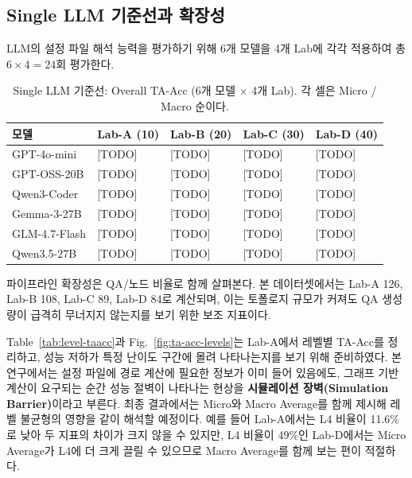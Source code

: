 \documentclass[journal]{IEEEtran}
\begin{document}
\subsection{Single LLM 기준선과 확장성}
LLM의 설정 파일 해석 능력을 평가하기 위해 6개 모델을 4개 Lab에 각각 적용하여 총 $6\times4=24$회 평가한다.

\begin{table}[!t]
  \caption{Single LLM 기준선: Overall TA-Acc (6개 모델 $\times$ 4개 Lab). 각 셀은 Micro / Macro 순이다.}
  \label{tab:single-llm-baseline}
  \centering
  \small
  \begin{tabular}{|L{2.8cm}|C{1.9cm}|C{1.9cm}|C{1.9cm}|C{1.9cm}|}
    \hline
    \textbf{모델}   & \textbf{Lab-A (10)} & \textbf{Lab-B (20)} & \textbf{Lab-C (30)} & \textbf{Lab-D (40)} \\
    \hline
    GPT-4o-mini   & [TODO]              & [TODO]              & [TODO]              & [TODO]              \\
    \hline
    GPT-OSS-20B   & [TODO]              & [TODO]              & [TODO]              & [TODO]              \\
    \hline
    Qwen3-Coder   & [TODO]              & [TODO]              & [TODO]              & [TODO]              \\
    \hline
    Gemma-3-27B   & [TODO]              & [TODO]              & [TODO]              & [TODO]              \\
    \hline
    GLM-4.7-Flash & [TODO]              & [TODO]              & [TODO]              & [TODO]              \\
    \hline
    Qwen3.5-27B   & [TODO]              & [TODO]              & [TODO]              & [TODO]              \\
    \hline
  \end{tabular}
\end{table}

파이프라인 확장성은 QA/노드 비율로 함께 살펴본다. 본 데이터셋에서는 Lab-A 126, Lab-B 108, Lab-C 89, Lab-D 84로 계산되며, 이는 토폴로지 규모가 커져도 QA 생성량이 급격히 무너지지 않는지를 보기 위한 보조 지표이다.

Table~\ref{tab:level-taacc}과 Fig.~\ref{fig:ta-acc-levels}는 Lab-A에서 레벨별 TA-Acc를 정리하고, 성능 저하가 특정 난이도 구간에 몰려 나타나는지를 보기 위해 준비하였다. 본 연구에서는 설정 파일에 경로 계산에 필요한 정보가 이미 들어 있음에도, 그래프 기반 계산이 요구되는 순간 성능 절벽이 나타나는 현상을 \textbf{시뮬레이션 장벽(Simulation Barrier)}이라고 부른다. 최종 결과에서는 Micro와 Macro Average를 함께 제시해 레벨 불균형의 영향을 같이 해석할 예정이다. 예를 들어 Lab-A에서는 L4 비율이 11.6\%로 낮아 두 지표의 차이가 크지 않을 수 있지만, L4 비율이 49\%인 Lab-D에서는 Micro Average가 L4에 더 크게 끌릴 수 있으므로 Macro Average를 함께 보는 편이 적절하다.
\end{document}
